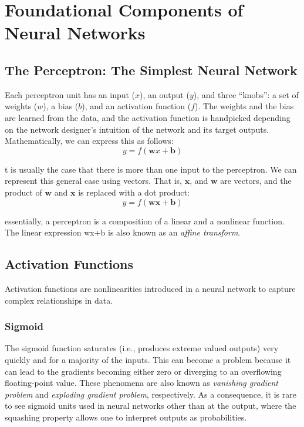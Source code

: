 \chapter{Foundational Components of Neural Networks\label{Ch03}}
\section{The Perceptron: The Simplest Neural Network}
Each perceptron unit has an input ($x$), an output ($y$), and three “knobs”: a set of
weights ($w$), a bias ($b$), and an activation function ($f$). The weights and the bias are
learned from the data, and the activation function is handpicked depending on the
network designer's intuition of the network and its target outputs. Mathematically,
we can express this as follows:
$$y = f(\textbf{w}x + \textbf{b})$$


t is usually the case that there is more than one input to the perceptron. We can represent this general case using vectors. That is, $\textbf{x}$, and $\textbf{w}$ are vectors, and the product of $\textbf{w}$ and $\textbf{x}$ is replaced with a dot product:
$$y = f(\textbf{w}\textbf{x} + \textbf{b})$$

essentially, a perceptron is a composition of a linear and a nonlinear function. The linear expression wx+b is also known as an \textit{affine transform}.

\section{Activation Functions}
Activation functions are nonlinearities introduced in a neural network to capture complex relationships in data.
\subsection{Sigmoid}
The sigmoid function saturates (i.e., produces extreme valued outputs) very quickly and for a majority of the inputs. This can become a problem because it can lead to the gradients becoming either zero or diverging to an overflowing floating-point value. These phenomena are also known as \textit{vanishing gradient problem} and \textit{exploding gradient problem}, respectively. As a consequence, it is rare to see sigmoid units used in neural networks other than at the output, where the squashing property allows one to interpret outputs as probabilities.

